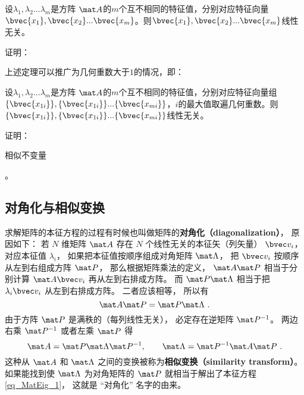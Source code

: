 \begin{theorem}{}
设$\lambda_1,\lambda_2...\lambda_m$是方阵 $\mat A$的$m$个互不相同的特征值，分别对应特征向量$\bvec {x_1},\bvec {x_2}...\bvec{x_m}$。则$\bvec {x_1},\bvec {x_2}...\bvec{x_m}$线性无关。
\end{theorem}
证明： 


上述定理可以推广为几何重数大于$1$的情况，即：
\begin{corollary}{}
设$\lambda_1,\lambda_2...\lambda_m$是方阵 $\mat A$的$m$个互不相同的特征值，分别对应特征向量组$\{\bvec{x_{1i}}\},\{\bvec{x_{1i}}\}...\{\bvec {x_{mi}}\}$，$i$的最大值取遍几何重数。则$\{\bvec{x_{1i}}\},\{\bvec{x_{1i}}\}...\{\bvec {x_{mi}}\}$线性无关。
\end{corollary}
证明：
\begin{theorem}{相似不变量}

\end{theorem}
。

\subsection{对角化与相似变换}
求解矩阵的本征方程的过程有时候也叫做矩阵的\textbf{对角化（diagonalization）}， 原因如下： 若 $N$ 维矩阵 $\mat A$ 存在 $N$ 个线性无关的本征矢（列矢量） $\bvec v_i$， 对应本征值 $\lambda_i$， 如果把本征值按顺序组成对角矩阵 $\mat \Lambda$， 把 $\bvec v_i$ 按顺序从左到右组成方阵 $\mat P$， 那么根据矩阵乘法的定义， $\mat A \mat P$ 相当于分别计算 $\mat A\bvec v_i$ 再从左到右排成方阵。 而 $\mat P\mat\Lambda$ 相当于把 $\lambda_i\bvec v_i$ 从左到右排成方阵。 二者应该相等， 所以有
\begin{equation}
\mat A \mat P = \mat P\mat\Lambda~.
\end{equation}
由于方阵 $\mat P$ 是满秩的（每列线性无关）， 必定存在逆矩阵%
$\mat P^{-1}$。 两边右乘 $\mat P^{-1}$ 或者左乘 $\mat P$ 得
\begin{equation}\label{eq_MatEig_3}
\mat A = \mat P\mat\Lambda\mat P^{-1}, \qquad
\mat \Lambda = \mat P^{-1}\mat A \mat P~.
\end{equation}
这种从 $\mat A$ 和 $\mat\Lambda$ 之间的变换被称为\textbf{相似变换（similarity transform）}。 如果能找到使 $\mat\Lambda$ 为对角矩阵的 $\mat P$ 就相当于解出了本征方程\autoref{eq_MatEig_1}， 这就是 “对角化” 名字的由来。
